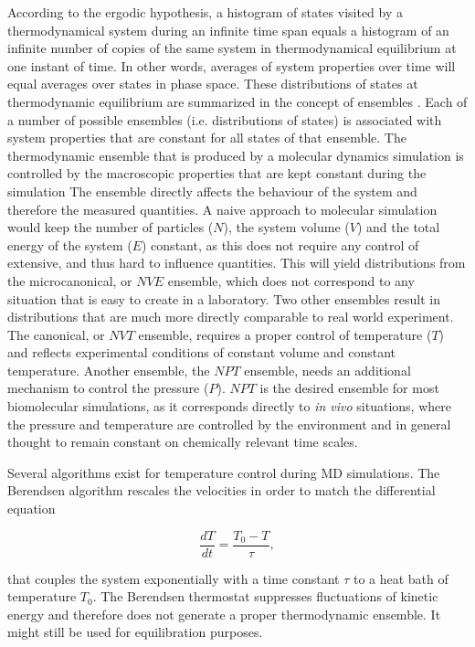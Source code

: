 \documentclass[english, a4paper, 12pt, titlepage, draft]{article}
\begin{document}
According to the ergodic hypothesis, a histogram of states visited by a thermodynamical system during an infinite time span equals a histogram of an infinite number of copies of the same system in thermodynamical equilibrium at one instant of time.
In other words, averages of system properties over time will equal averages over states in phase space.
These distributions of states at thermodynamic equilibrium are summarized in the concept of ensembles \cite{Atkins}. 
Each of a number of possible ensembles (i.e. distributions of states) is associated with system properties that are constant for all states of that ensemble.
The thermodynamic ensemble that is produced by a molecular dynamics simulation is controlled by the macroscopic properties that are kept constant during the simulation
The ensemble directly affects the behaviour of the system and therefore the measured quantities.
A naive approach to molecular simulation would keep the number of particles ($N$), the system volume ($V$) and the total energy of the system ($E$) constant, as this does not require any control of extensive, and thus hard to influence quantities.
This will yield distributions from the microcanonical, or $NVE$ ensemble, which does not correspond to any situation that is easy to create in a laboratory.
Two other ensembles result in distributions that are much more directly comparable to real world experiment.
The canonical, or $NVT$ ensemble, requires a proper control of temperature ($T$) and reflects experimental conditions of constant volume and constant temperature.
Another ensemble, the $NPT$ ensemble, needs an additional mechanism to control the pressure ($P$).
$NPT$ is the desired ensemble for most biomolecular simulations, as it corresponds directly to \textit{in vivo} situations, where the pressure and temperature are controlled by the environment and in general thought to remain constant on chemically relevant time scales.

Several algorithms exist for temperature control during MD simulations.
The Berendsen algorithm \cite{BerendsenTempControl} rescales the velocities in order to match the differential equation

\begin{equation}
    \frac{dT}{dt} = \frac{T_0 - T}{\tau},
\end{equation}

\noindent
that couples the system exponentially with a time constant $\tau$ to a heat bath of temperature $T_0$.
The Berendsen thermostat suppresses fluctuations of kinetic energy and therefore does not generate a proper thermodynamic ensemble. It might still be used for equilibration purposes.
\end{document}
